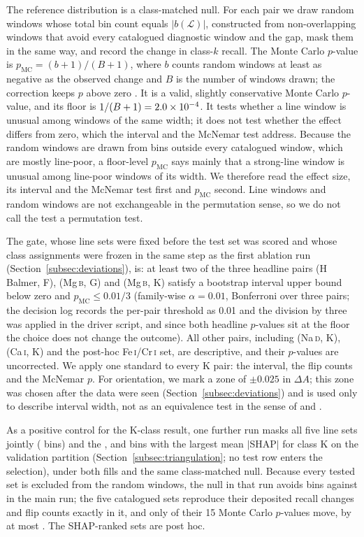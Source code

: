 \documentclass[11pt,a4paper]{article}
\newcommand{\Mgb}{Mg\,\textsc{b}\xspace}
\newcommand{\NaD}{Na\,\textsc{d}\xspace}
\newcommand{\CaI}{Ca\,\textsc{i}\xspace}
\newcommand{\FeCr}{Fe\,\textsc{i}/Cr\,\textsc{i}\xspace}
\newcommand{\dA}{\Delta A}
\begin{document}
The reference distribution is a class-matched null. For each pair we draw \ablNControls{} random windows whose total bin count equals $|b(\mathcal{L})|$, constructed from non-overlapping windows that avoid every catalogued diagnostic window and the gap, mask them in the same way, and record the change in class-$k$ recall. The Monte Carlo $p$-value is $p_{\mathrm{MC}} = (b+1)/(B+1)$, where $b$ counts random windows at least as negative as the observed change and $B$ is the number of windows drawn; the correction keeps $p$ above zero \citep{2010SAGMB...9...39P}. It is a valid, slightly conservative Monte Carlo $p$-value, and its floor is $1/(B+1) = 2.0\times10^{-4}$. It tests whether a line window is unusual among windows of the same width; it does not test whether the effect differs from zero, which the interval and the McNemar test address. Because the random windows are drawn from bins outside every catalogued window, which are mostly line-poor, a floor-level $p_{\mathrm{MC}}$ says mainly that a strong-line window is unusual among line-poor windows of its width. We therefore read the effect size, its interval and the McNemar test first and $p_{\mathrm{MC}}$ second. Line windows and random windows are not exchangeable in the permutation sense, so we do not call the test a permutation test.

The gate, whose line sets were fixed before the test set was scored and whose class assignments were frozen in the same step as the first ablation run (Section~\ref{subsec:deviations}), is: at least two of the three headline pairs (H Balmer, F), (\Mgb, G) and (\Mgb, K) satisfy a bootstrap interval upper bound below zero and $p_{\mathrm{MC}} \le 0.01/3$ (family-wise $\alpha = 0.01$, Bonferroni over three pairs; the decision log records the per-pair threshold as 0.01 and the division by three was applied in the driver script, and since both headline $p$-values sit at the floor the choice does not change the outcome). All other pairs, including (\NaD, K), (\CaI, K) and the post-hoc \FeCr set, are descriptive, and their $p$-values are uncorrected. We apply one standard to every K pair: the interval, the flip counts and the McNemar $p$. For orientation, we mark a zone of $\pm 0.025$ in $\dA$; this zone was chosen after the data were seen (Section~\ref{subsec:deviations}) and is used only to describe interval width, not as an equivalence test in the sense of \citet{Schuirmann1987TOST} and \citet{Lakens2017TOST}.

As a positive control for the K-class result, one further run masks all five line sets jointly (\pcBinsJoint{} bins) and the \pcBinsTopTwenty, \pcBinsTopFifty{} and \pcBinsTopHundred{} bins with the largest mean $|$SHAP$|$ for class K on the validation partition (Section~\ref{subsec:triangulation}; no test row enters the selection), under both fills and the same class-matched null. Because every tested set is excluded from the random windows, the null in that run avoids \pcForbiddenBins{} bins against \pcForbiddenBinsDeposited{} in the main run; the five catalogued sets reproduce their deposited recall changes and flip counts exactly in it, and only \pcNineSetNMismatch{} of their 15 Monte Carlo $p$-values move, by at most \pcNineSetMaxPDiff. The SHAP-ranked sets are post hoc.
\end{document}
